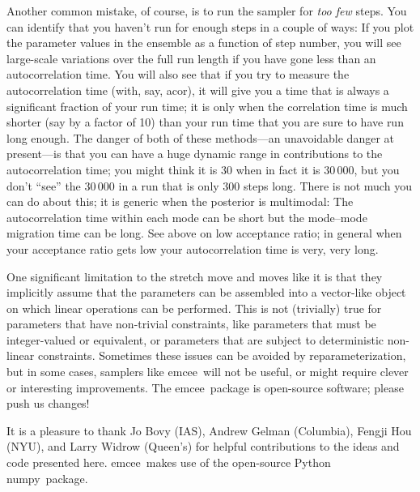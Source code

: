 \documentclass[12pt,preprint]{aastex}
\newcommand{\project}[1]{{\sffamily #1}}
\newcommand{\numpy}{\project{numpy}}
\newcommand{\acor}{\project{acor}}
\newcommand{\thisplain}{emcee}
\newcommand{\this}{\project{\thisplain}}
\begin{document}
Another common mistake, of course, is to run the sampler for \emph{too
  few} steps.  You can identify that you haven't run for enough steps
in a couple of ways: If you plot the parameter values in the ensemble
as a function of step number, you will see large-scale variations over
the full run length if you have gone less than an autocorrelation
time.  You will also see that if you try to measure the
autocorrelation time (with, say, \acor), it will give you a time that
is always a significant fraction of your run time; it is only when the
correlation time is much shorter (say by a factor of 10) than your run
time that you are sure to have run long enough.  The danger of both of
these methods---an unavoidable danger at present---is that you can
have a huge dynamic range in contributions to the autocorrelation
time; you might think it is 30 when in fact it is 30\,000, but you
don't ``see'' the 30\,000 in a run that is only 300 steps long.  There
is not much you can do about this; it is generic when the posterior is
multimodal: The autocorrelation time within each mode can be short but
the mode--mode migration time can be long.  See above on low
acceptance ratio; in general when your acceptance ratio gets low your
autocorrelation time is very, very long.

One significant limitation to the stretch move and moves like it is
that they implicitly assume that the parameters can be assembled into
a vector-like object on which linear operations can be performed.
This is not (trivially) true for parameters that have non-trivial
constraints, like parameters that must be integer-valued or
equivalent, or parameters that are subject to deterministic non-linear
constraints.  Sometimes these issues can be avoided by
reparameterization, but in some cases, samplers like \this\ will not
be useful, or might require clever or interesting improvements.  The
\this\ package is open-source software; please push us changes!

\acknowledgments It is a pleasure to thank Jo Bovy (IAS), Andrew
Gelman (Columbia), Fengji Hou (NYU), and Larry Widrow (Queen's) for
helpful contributions to the ideas and code presented here.
\this\ makes use of the open-source Python \numpy\ package.
\end{document}
